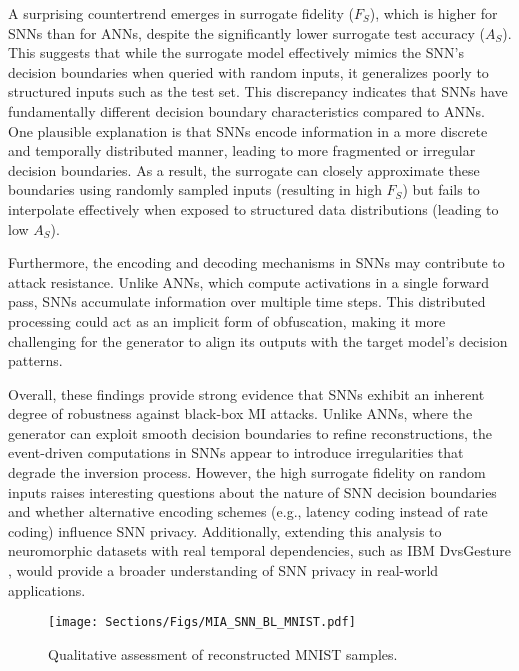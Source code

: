 A surprising countertrend emerges in surrogate fidelity (\( F_S \)), which is higher for SNNs than for ANNs, despite the significantly lower surrogate test accuracy (\( A_S \)). This suggests that while the surrogate model effectively mimics the SNN’s decision boundaries when queried with random inputs, it generalizes poorly to structured inputs such as the test set.
This discrepancy indicates that SNNs have fundamentally different decision boundary characteristics compared to ANNs. One plausible explanation is that SNNs encode information in a more discrete and temporally distributed manner, leading to more fragmented or irregular decision boundaries. As a result, the surrogate can closely approximate these boundaries using randomly sampled inputs (resulting in high \( F_S \)) but fails to interpolate effectively when exposed to structured data distributions (leading to low \( A_S \)).


Furthermore, the encoding and decoding mechanisms in SNNs may contribute to attack resistance. Unlike ANNs, which compute activations in a single forward pass, SNNs accumulate information over multiple time steps. This distributed processing could act as an implicit form of obfuscation, making it more challenging for the generator to align its outputs with the target model’s decision patterns.




Overall, these findings provide strong evidence that SNNs exhibit an inherent degree of robustness against black-box MI attacks.
Unlike ANNs, where the generator can exploit smooth decision boundaries to refine reconstructions, the event-driven computations in SNNs appear to introduce irregularities that degrade the inversion process. However, the high surrogate fidelity on random inputs raises interesting questions about the nature of SNN decision boundaries and whether alternative encoding schemes (e.g., latency coding instead of rate coding) influence SNN privacy. Additionally, extending this analysis to neuromorphic datasets with real temporal dependencies, such as IBM DvsGesture \cite{amir2017low}, would provide a broader understanding of SNN privacy in real-world applications.



\begin{figure}[h]
  \centering
  \texttt{[image: Sections/Figs/MIA\_SNN\_BL\_MNIST.pdf]}
  \caption{Qualitative assessment of reconstructed MNIST samples.}
  \label{fig:visual_mnist}
\end{figure}

